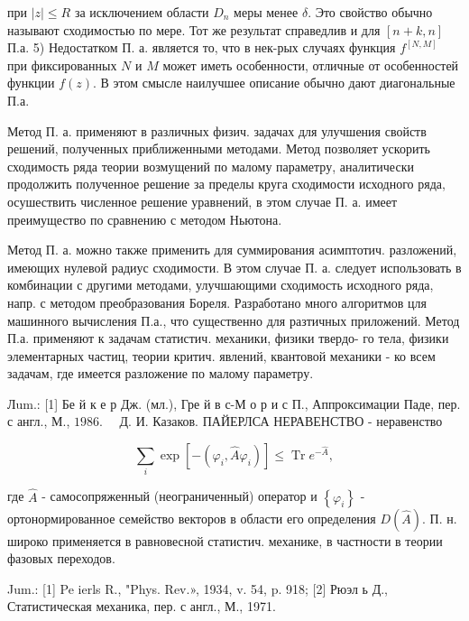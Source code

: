 \documentclass[10pt]{article}
\begin{document}
при $|z| \leqslant R$ за исключением области $D_{n}$ меры менее $\delta$. Это свойство обычно называют сходимостью по мере. Тот же результат справедлив и для $[n+k, n]$ П.а. 5) Недостатком П. а. является то, что в нек-рых случаях функция $f^{[N, M]}$ при фиксированных $N$ и $M$ может иметь особенности, отличные от особенностей функции $f(z)$. В этом смысле наилучшее описание обычно дают диагональные П.а.



Метод П. а. применяют в различных физич. задачах для улучшения свойств решений, полученных приближенными методами. Метод позволяет ускорить сходимость ряда теории возмущений по малому параметру, аналитически продолжить полученное решение за пределы круга сходимости исходного ряда, осушествить численное решение уравнений, в этом случае П. а. имеет преимущество по сравнению с методом Ньютона.



Метод П. а. можно также применить для суммирования асимптотич. разложений, имеющих нулевой радиус сходимости. В этом случае П. а. следует использовать в комбинации с другими методами, улучшающими сходимость исходного ряда, напр. с методом преобразования Бореля. Разработано много алгоритмов цля машинного вычисления П.а., что существенно для разтичных приложений. Метод П.а. применяют к задачам статистич. механики, физики твердо- го тела, физики элементарных частиц, теории критич. явлений, квантовой механики - ко всем задачам, где имеется разложение по малому параметру.



Лum.: [1] Бе й к е р Дж. (мл.), Гре й в с-М о р и с П., Аппроксимации Паде, пер. с англ., М., $1986 . \quad$ Д. И. Казаков. ПАЙЕРЛСА НЕРАВЕНСТВО - неравенство



\[

\sum_{i} \exp \left[-\left(\varphi_{i}, \hat{A} \varphi_{i}\right)\right] \leqslant \operatorname{Tr} e^{-\hat{A}},

\]



где $\hat{A}$ - самосопряженный (неограниченный) оператор и $\left\{\varphi_{i}\right\}$ - ортонормированное семейство векторов в области его определения $D(\hat{A})$. П. н. широко применяется в равновесной статистич. механике, в частности в теории фазовых переходов.



Jum.: [1] Pe ierls R., "Phys. Rev.», 1934, v. 54, p. 918; [2] Рюэл ь Д., Статистическая механика, пер. с англ., М., 1971.
\end{document}

